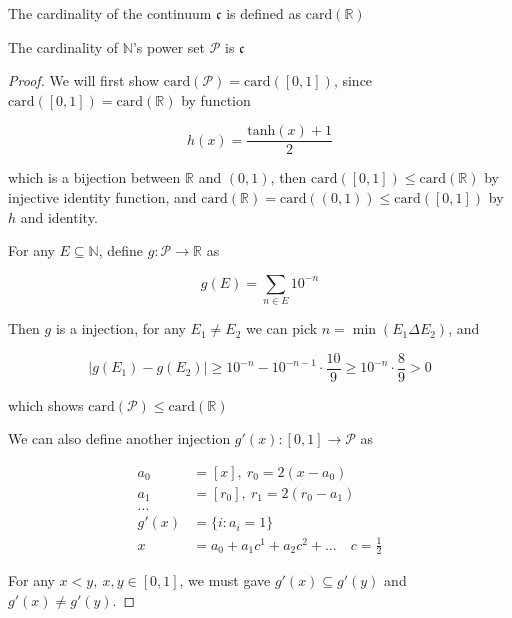 \begin{definition}
    The cardinality of the continuum $\mathfrak{c}$ is defined as $\mathrm{card}(\mathbb{R})$
\end{definition}

\begin{thm}
    The cardinality of $\mathbb{N}$'s power set $\mathcal{P}$ is $\mathfrak{c}$
\end{thm}

\begin{proof}
    We will first show $\mathrm{card}(\mathcal{P}) = \mathrm{card}([0,1])$, since $\mathrm{card}([0,1]) = \mathrm{card}(\mathbb{R})$ by function

    \[
        h(x) = \frac{\mathrm{tanh}(x) + 1}{2}
    \]

    which is a bijection between $\mathbb{R}$ and $(0,1)$, then $\mathrm{card}([0,1]) \le \mathrm{card}(\mathbb{R})$
    by  injective identity function, and $\mathrm{card}(\mathbb{R}) = \mathrm{card}((0,1)) \le \mathrm{card}([0,1])$ 
    by $h$ and identity.

    For any $E \subseteq \mathbb{N}$, define $g: \mathcal{P} \to \mathbb{R}$ as

    \[
        g(E) = \sum_{n \in E} 10^{-n}
    \]

    Then $g$ is a injection, for any $E_1 \ne E_2$ we can pick $n = \min ( E_1 \Delta E_2 )$, and 
    
    \[
        \left| g(E_1) - g(E_2)\right| \ge 10^{-n} - 10^{-n-1} \cdot \frac{10}{9} \ge 10^{-n} \cdot \frac{8}{9} > 0
    \]

    which shows $\mathrm{card}(\mathcal{P}) \le \mathrm{card}(\mathbb{R})$

    We can also define another injection $g'(x): [0,1] \to \mathcal{P}$ as

    \begin{align*}
        a_0 &= [x],\: r_0 = 2(x - a_0) \\
        a_1 &= [r_0],\: r_1 = 2(r_0 - a_1) \\
        \dots & \\
        g'(x) &= \{ i: a_i = 1 \} \\
        x &= a_0  + a_1 c^{1} + a_2 c^{2} + \dots  \quad c = \frac{1}{2}
    \end{align*}

    For any $x <y,\: x,y \in [0,1]$, we must gave $g'(x) \subseteq g'(y)$ and  $g'(x) \ne g'(y)$.

\end{proof}


